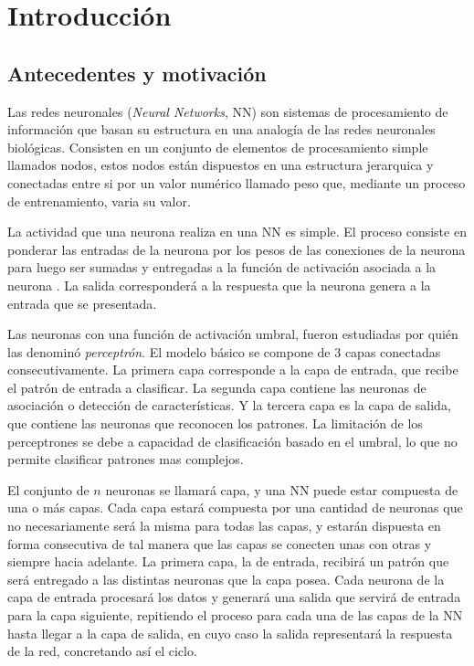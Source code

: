 \chapter{Introducción}
\section{Antecedentes y motivación}
Las redes neuronales ({\em Neural Networks}, NN) son sistemas de procesamiento de información que basan su estructura en una analogía de las redes neuronales biológicas. Consisten en un conjunto de elementos de procesamiento simple llamados nodos, estos nodos están dispuestos en una estructura jerarquica y conectadas entre si por un valor numérico llamado peso que, mediante un proceso de entrenamiento, varia su valor.

La actividad que una neurona realiza en una NN es simple. El proceso consiste en ponderar las entradas de la neurona por los pesos de las conexiones de la neurona para luego ser sumadas y entregadas a la función de activación asociada a la neurona \cite{McCulloch1943}. La salida corresponderá a la respuesta que la neurona genera a la entrada que se presentada.

Las neuronas con una función de activación umbral, fueron estudiadas por  quién las denominó {\em perceptrón}. El modelo básico se compone de 3 capas conectadas consecutivamente. La primera capa corresponde a la capa de entrada, que recibe el patrón de entrada a clasificar. La segunda capa contiene las neuronas de asociación o detección de características. Y la tercera capa es la capa de salida, que contiene las neuronas que reconocen los patrones. La limitación de los perceptrones se debe a capacidad de clasificación basado en el umbral, lo que no permite clasificar patrones mas complejos.

El conjunto de $n$ neuronas se llamará capa, y una NN puede estar compuesta de una o más capas. Cada capa estará compuesta por una cantidad de neuronas que no necesariamente será la misma para todas las capas, y estarán dispuesta en forma consecutiva de tal manera que las capas se conecten unas con otras y siempre hacia adelante. La primera capa, la de entrada, recibirá un patrón que será entregado a las distintas neuronas que la capa posea. Cada neurona de la capa de entrada procesará los datos y generará una salida que servirá de entrada para la capa siguiente, repitiendo el proceso para cada una de las capas de la NN hasta llegar a la capa de salida, en cuyo caso la salida representará la respuesta de la red, concretando así el ciclo.

